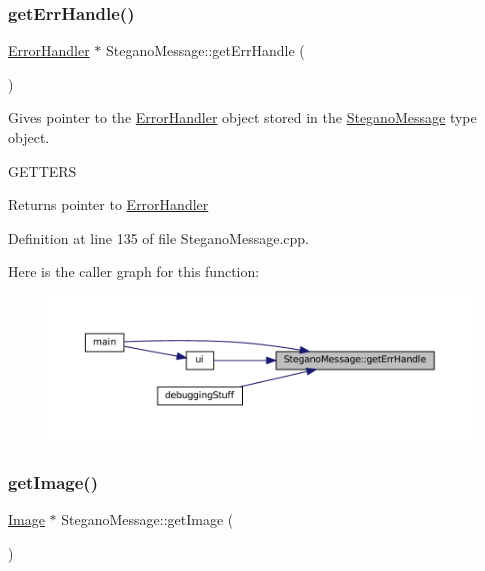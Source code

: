 \subsubsection{\texorpdfstring{getErrHandle()}{getErrHandle()}}
{\footnotesize\ttfamily \mbox{\hyperlink{classErrorHandler}{Error\+Handler}} $\ast$ Stegano\+Message\+::get\+Err\+Handle (\begin{DoxyParamCaption}{ }\end{DoxyParamCaption})}



Gives pointer to the \mbox{\hyperlink{classErrorHandler}{Error\+Handler}} object stored in the \mbox{\hyperlink{classSteganoMessage}{Stegano\+Message}} type object. 

G\+E\+T\+T\+E\+RS\begin{DoxyReturn}{Returns}
pointer to \mbox{\hyperlink{classErrorHandler}{Error\+Handler}} 
\end{DoxyReturn}


Definition at line 135 of file Stegano\+Message.\+cpp.

Here is the caller graph for this function\+:\nopagebreak
\begin{figure}[H]
\begin{center}
\leavevmode
\includegraphics[width=350pt]{classSteganoMessage_a0134757a8c79caa9dca9bcce0686d1ef_icgraph}
\end{center}
\end{figure}
\mbox{\label{classSteganoMessage_a2e3ad705a0219edfd2150f3f7931979c}} 
\subsubsection{\texorpdfstring{getImage()}{getImage()}}
{\footnotesize\ttfamily \mbox{\hyperlink{classImage}{Image}} $\ast$ Stegano\+Message\+::get\+Image (\begin{DoxyParamCaption}{ }\end{DoxyParamCaption})}



